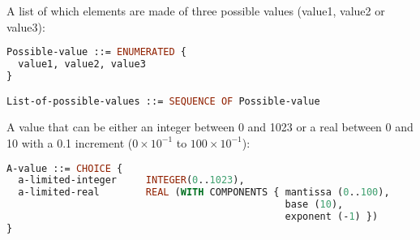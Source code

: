 A list of which elements are made of three possible values (value1,
value2 or value3):
\begin{lstlisting}[language=ASN1]
Possible-value ::= ENUMERATED {
  value1, value2, value3
}

List-of-possible-values ::= SEQUENCE OF Possible-value
\end{lstlisting}

A value that can be either an integer between 0 and 1023 or a real
between 0 and 10 with a 0.1 increment ($0 \times 10^{-1}$ to $100
\times 10^{-1}$):
\begin{lstlisting}[language=ASN1]
A-value ::= CHOICE {
  a-limited-integer     INTEGER(0..1023),
  a-limited-real        REAL (WITH COMPONENTS { mantissa (0..100),
                                                base (10),
                                                exponent (-1) })
}
\end{lstlisting}


